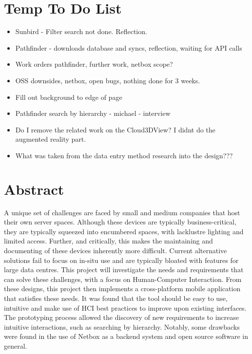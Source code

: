 \documentclass [11pt,a4paper]{article}
\begin{document}
\section{Temp To Do List}
\begin{itemize}
    \item Sunbird - Filter search not done. Reflection. 
    \item Pathfinder - downloads database and syncs, reflection, waiting for API calls
    \item Work orders pathfinder, further work, netbox scope?
    \item OSS downsides, netbox, open bugs, nothing done for 3 weeks. 
    \item Fill out background to edge of page
    \item Pathfinder search by hierarchy - michael - interview
    \item Do I remove the related work on the Cloud3DView? I didnt do the augmented reality part.
    \item What was taken from the data entry method research into the design???
\end{itemize}
\pagebreak

\section*{Abstract}
    \noindent
    A unique set of challenges are faced by small and medium companies that host their own server spaces. Although these devices are typically business-critical, they are typically squeezed into encumbered spaces, with lacklustre lighting and limited access. Further, and critically, this makes the maintaining and documenting of these devices inherently more difficult. Current alternative solutions fail to focus on in-situ use and are typically bloated with features for large data centres. This project will investigate the needs and requirements that can solve these challenges, with a focus on Human-Computer Interaction. From these designs, this project then implements a cross-platform mobile application that satisfies these needs. It was found that the tool should be easy to use, intuitive and make use of HCI best practices to improve upon existing interfaces. The prototyping process allowed the discovery of new requirements to increase intuitive interactions, such as searching by hierarchy. Notably, some drawbacks were found in the use of Netbox as a backend system and open source software in general.  
\end{document}

